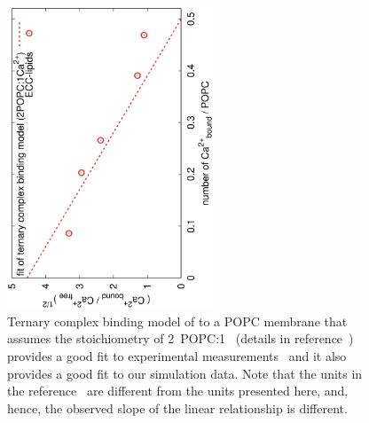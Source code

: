 \documentclass[aip,jcp,twocolumn]{revtex4}
\begin{document}
\begin{figure}[tbp]
  \centering
  \includegraphics[height=9.0cm,angle=-90]{../Fig/bound-CAs_conc-eccl17.eps}
  \caption{\label{fig:cacl-bind}
    Ternary complex binding model of  to a POPC membrane 
    that assumes the stoichiometry of 2~POPC:1~ (details in reference~) 
    provides a good fit to experimental measurements~\cite{altenbach84}
    and it also provides a good fit to our simulation data. 
    Note that the units in the reference~ are different from the units presented here,
    and, hence, the observed slope of the linear relationship is different.
    }
\end{figure}
\end{document}
